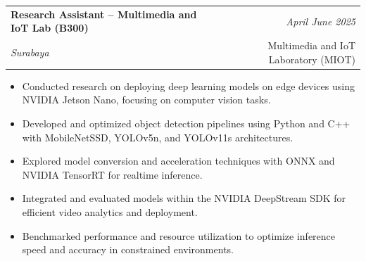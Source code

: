 \documentclass[a4paper,11pt]{article}
\makeatletter
\newcommand{\resumeSubheading}[4]{
\vspace{0.5mm}\item
    \begin{tabular*}{0.98\textwidth}[t]{l@{\extracolsep{\fill}}r}
        \textbf{#1} & \textit{\footnotesize{#4}} \\
        \textit{\footnotesize{#3}} &  \footnotesize{#2}\\
    \end{tabular*}
    \vspace{-2.4mm}
}
\newcommand{\resumeItemListStart}{\begin{justify}\begin{itemize}[leftmargin=3ex, rightmargin=2ex, noitemsep,labelsep=1.2mm,itemsep=0mm]\small}
\newcommand{\resumeItemListEnd}{\end{itemize}\end{justify}\vspace{-2mm}}
\makeatother
\begin{document}



\resumeSubheading
{Research Assistant – Multimedia and IoT Lab (B300)}{Multimedia and IoT Laboratory (MIOT)}
{Surabaya}{April \- June 2025}
\resumeItemListStart
\item {Conducted research on deploying deep learning models on edge devices using NVIDIA Jetson Nano, focusing on computer vision tasks.}
\item {Developed and optimized object detection pipelines using Python and C++ with MobileNet\-SSD, YOLOv5n, and YOLOv11s architectures.}
\item {Explored model conversion and acceleration techniques with ONNX and NVIDIA TensorRT for real\-time inference.}
\item {Integrated and evaluated models within the NVIDIA DeepStream SDK for efficient video analytics and deployment.}
\item {Benchmarked performance and resource utilization to optimize inference speed and accuracy in constrained environments.}
\resumeItemListEnd
\end{document}
